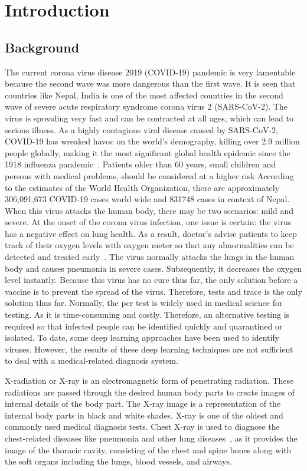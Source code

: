 \section{Introduction}

\subsection{Background}
 
The current corona virus disease 2019 (COVID-19) pandemic is very lamentable because the second wave was more dangerous than the first wave. It is seen that countries like Nepal, India is one of the most affected countries in the second wave of severe acute respiratory syndrome corona virus 2 (SARS-CoV-2). The virus is spreading very fast and can be contracted at all ages, which can lead to serious illness. As a highly contagious viral disease caused by SARS-CoV-2, COVID-19 has wreaked havoc on the world’s demography, killing over 2.9 million people globally, making it the most significant global health epidemic since the 1918 influenza pandemic~\cite{cascella_features_2021}. Patients older than 60 years, small children and persons with medical problems, should be considered at a higher risk According to the estimates of the World Health Organization, there are approximately 306,091,673 COVID-19 cases world wide and 831748 cases in context of Nepal. When this virus attacks the human body, there may be two scenarios: mild and severe. At the onset of the corona virus infection, one issue is certain: the virus has a negative effect on lung health. As a result, doctor’s advise patients to keep track of their oxygen levels with oxygen meter so that any abnormalities can be detected and treated early~\cite{Rubin2020}. The virus normally attacks the lungs in the human body and causes pneumonia in severe cases. Subsequently, it decreases the oxygen level instantly. Because this virus has no cure thus far, the only solution before a vaccine is to prevent the spread of the virus. Therefore, tests and trace is the only solution thus far. Normally, the \acrfull{pcr} test is widely used in medical science for testing. As it is time-consuming and costly. Therefore, an alternative testing is required so that infected people can be identified quickly and quarantined or isolated. To date, some deep learning approaches have been used to identify viruses. However, the results of these deep learning techniques are not sufficient to deal with a medical-related diagnosis system. 

X-radiation or X-ray is an electromagnetic form of penetrating radiation. These radiations are passed through the desired human body parts to create images of internal details of the body part. The X-ray image is a representation of the internal body parts in black and white shades. X-ray is one of the oldest and commonly used medical diagnosis tests. Chest X-ray is used to diagnose the chest-related diseases like pneumonia and other lung diseases~\cite{Rubin2020}, as it provides the image of the thoracic cavity, consisting of the chest and spine bones along with the soft organs including the lungs, blood vessels, and airways. 


